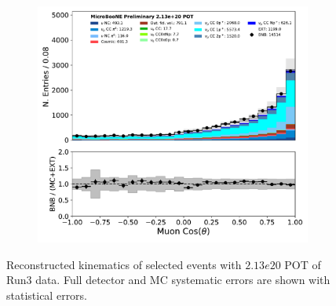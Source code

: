 \begin{figure}[hbt!]
\begin{center}
\begin{subfigure}[b]{0.3\textwidth}
    \caption{\label{fig:NuMUCCsel:ryan:run3kinematics:muonE}}
    \end{subfigure}
    \begin{subfigure}[b]{0.3\textwidth}
    \centering
    \includegraphics[width=1.00\textwidth]{NuMuCCsel/Images/Ryan/fullselection_run3_fullsystematics/trk_cos_theta_v_07232020_fullsel_samples_detsys_event_category.pdf}
    \caption{\label{fig:NuMUCCsel:ryan:run3kinematics:cosTheta}}
    \end{subfigure} %
\caption{Reconstructed kinematics of selected events with $2.13e20$ POT of Run3 data. Full detector and MC systematic errors are shown with statistical errors.}
\label{fig:NuMuCCsel:run3kinematics}
\end{center}
\end{figure}

